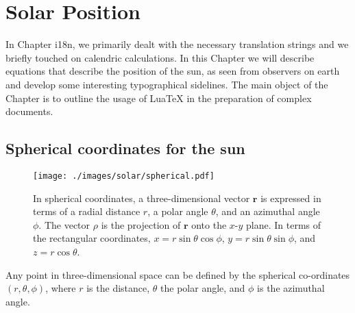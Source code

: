 

\newcommand{\be}{\begin{equation}}
\newcommand{\ee}{\end{equation}}
\newcommand{\VV}[1]{\mathbf #1}						%
\newcommand{\la}[1]{\label{#1}}
\newcommand{\Eq}[1]{Eq.~(\ref{#1})}
\newcommand{\Eqs}[2]{Eqs.~(\ref{#1},\ref{#2})}
\newcommand{\bea}{\begin{eqnarray}}
\newcommand{\eea}{\end{eqnarray}}
\newcommand{\Sec}[1]{Sec.~\ref{#1}}
\newcommand{\Secs}[2]{Secs.~\ref{#1}, \ref{#2}}

\newcommand{\Fig}[1]{Fig.~\ref{#1}}
\def\nn{\nonumber \\ }

\chapter{Solar Position}
\label{ch:solar}

In Chapter i18n, we primarily dealt with the necessary translation strings and we briefly touched on 
calendric calculations. In this Chapter we will describe equations that describe the position of the sun, as seen from observers on earth and develop some interesting typographical sidelines. The main object of the Chapter is to outline the usage of LuaTeX in the preparation of complex documents.

\section{Spherical coordinates for the sun}

\begin{figure} [tbh]
\begin{center}
	\texttt{[image: ./images/solar/spherical.pdf]}
\end{center}
\caption{\small In spherical coordinates, a three-dimensional vector $\VV r$ is expressed in terms of a radial distance $r$, a polar angle $\theta$, and an azimuthal angle $\phi$.  The vector {\boldmath $\rho$} is the projection of $\VV r$ onto the $x$-$y$ plane.  In terms of the rectangular coordinates, $x = r \sin \theta \cos \phi$, $y = r \sin \theta \sin \phi$, and $z = r \cos \theta$.\la{fig:spherical}}
\end{figure}

Any point in three-dimensional space can be defined by the spherical co-ordinates $(r, \theta, \phi)$, where $r$ is the distance, $\theta$ the polar angle, and $\phi$ is the azimuthal angle. 

